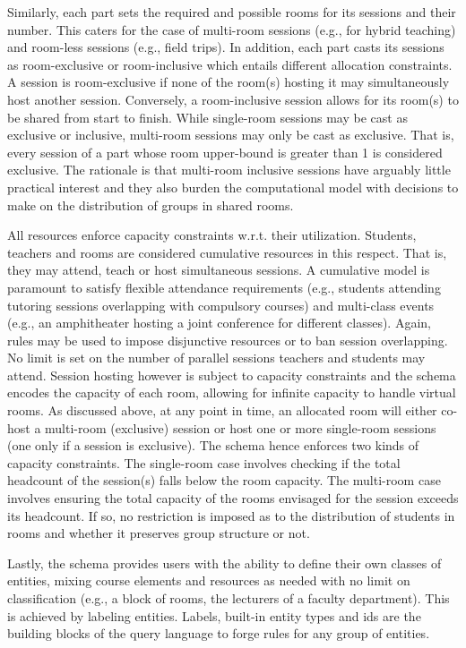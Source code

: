 \documentclass[runningheads]{llncs}
\begin{document}
Similarly, each part sets the required and possible rooms for its sessions and their number.
This caters for the case of multi-room sessions (e.g., for hybrid teaching)
and room-less sessions (e.g., field trips). In addition, each part casts its sessions as room-exclusive or room-inclusive
which entails different allocation constraints.
A session is room-exclusive if none of the room(s) hosting it may simultaneously host another session.
Conversely, a room-inclusive session allows for its room(s) to be shared from start to finish.
While single-room sessions may be cast as exclusive or inclusive,
multi-room sessions may only be cast as exclusive.
That is, every session of a part whose room upper-bound is greater than 1 is considered exclusive. 
The rationale is that multi-room inclusive sessions have arguably little practical interest and they also burden the computational model with decisions to make on the distribution of groups in shared rooms. 

All resources enforce capacity constraints w.r.t. their utilization.
Students, teachers and rooms are considered cumulative resources in this respect.
That is, they may attend, teach or host simultaneous sessions.
A cumulative model is paramount 
to satisfy flexible attendance requirements
(e.g., students attending tutoring sessions overlapping with compulsory courses)
and multi-class events 
(e.g., an amphitheater hosting a joint conference for different classes).
Again, rules may be used to impose disjunctive resources 
or to ban session overlapping.
No limit is set on the number of parallel sessions teachers and students may attend.
Session hosting however is subject to capacity constraints
and the schema encodes the capacity of each room,
allowing for infinite capacity to handle virtual rooms. As discussed above, 
at any point in time, 
an allocated room will
either 
co-host a multi-room (exclusive) session
or host one or more single-room sessions (one only if a session is exclusive).
The schema hence enforces two kinds of capacity constraints.
The single-room case involves checking
if the total headcount of the session(s) falls below the room capacity.
The multi-room case involves
ensuring the total capacity of the rooms envisaged for the session exceeds its headcount.
If so, 
no restriction is imposed as to the distribution of students in rooms
and whether it preserves group structure or not.

Lastly, the schema provides users with the ability to define their own classes of entities,
mixing course elements and resources as needed
with no limit on classification
(e.g., a block of rooms, the lecturers of a faculty department).
This is achieved by labeling entities.
Labels, built-in entity types and ids
are the building blocks of the query language
to forge rules for any group of entities.
\end{document}
